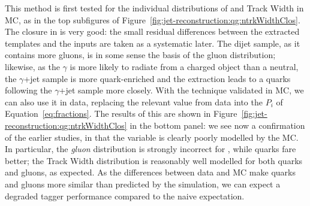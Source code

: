 This method is first tested for the individual distributions of \ntrk and Track Width in MC, as in the top subfigures of Figure~\ref{fig:jet-reconstruction:qg:ntrkWidthClos}. The closure in \Pythia is very good: the small residual differences between the extracted templates and the inputs are taken as a systematic later. The dijet sample, as it contains more gluons, is in some sense the basis of the gluon distribution; likewise, as the $\gamma$ is more likely to radiate from a charged object than a neutral, the $\gamma$+jet sample is more quark-enriched and the extraction leads to a quarks following the $\gamma$+jet sample more closely. With the technique validated in MC, we can also use it in data, replacing the relevant value from data into the $P_i$ of Equation~\ref{eq:fractions}. The results of this are shown in Figure~\ref{fig:jet-reconstruction:qg:ntrkWidthClos} in the bottom panel: we see now a confirmation of the earlier studies, in that the \ntrk variable is clearly poorly modelled by the MC. In particular, the \textit{gluon} distribution is strongly incorrect for \ntrk, while quarks fare better; the Track Width distribution is reasonably well modelled for both quarks and gluons, as expected. As the differences between data and MC make quarks and gluons more similar than predicted by the simulation, we can expect a degraded tagger performance compared to the naive expectation.


\begin{figure*}[p]
\begin{center}
 \\
\caption{ Average (a,c) \ntrk and (b,d) track width for quark- (solid symbols) and gluon-jets
(open symbols) as a function of reconstructed jet $\pt$ for isolated jets with $|\eta|<0.8$.
Results are shown for distributions obtained using the template extraction method in
 simulation (black circles, (a,b)) or data (black circles, (c,d)), as well as for 
labeled jets in the dijet sample (triangles) and in the $\gamma$+jet sample (squares).
The error bars represent only statistical uncertainties. Isolated jets are reconstructed using the
\akt jet algorithm with radius parameter $R=0.4$. The bottom panels show
the ratio of the results obtained with the in-situ extraction method to the results
in the dijet and $\gamma$+jet MC samples. }
\label{fig:jet-reconstruction:qg:ntrkWidthClos}
\end{center}
\end{figure*}

